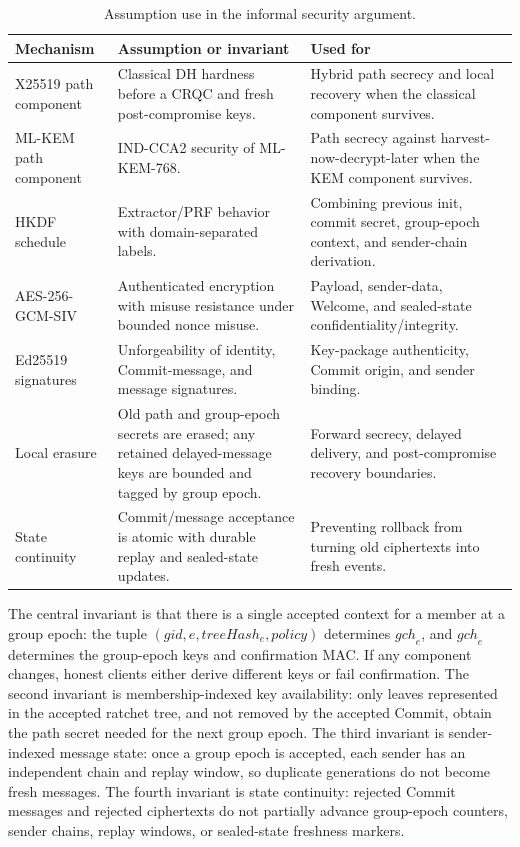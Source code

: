 \documentclass[preprint,12pt]{elsarticle}
\theoremstyle{definition}
\newcommand{\gid}{\mathit{gid}}
\newcommand{\gch}{\mathit{gch}}
\newcommand{\policy}{\mathit{policy}}
\newcommand{\treehash}{\mathit{treeHash}}
\begin{document}
\begin{table}[tbp]
\centering
\caption{Assumption use in the informal security argument.}\label{tab:assumptions}
\small
\begin{tabularx}{\textwidth}{@{}p{}YY@{}}
\toprule
Mechanism & Assumption or invariant & Used for \\
\midrule
X25519 path component & Classical DH hardness before a CRQC and fresh post-compromise keys. & Hybrid path secrecy and local recovery when the classical component survives. \\
ML-KEM path component & IND-CCA2 security of ML-KEM-768. & Path secrecy against harvest-now-decrypt-later when the KEM component survives. \\
HKDF schedule & Extractor/PRF behavior with domain-separated labels. & Combining previous init, commit secret, group-epoch context, and sender-chain derivation. \\
AES-256-GCM-SIV & Authenticated encryption with misuse resistance under bounded nonce misuse. & Payload, sender-data, Welcome, and sealed-state confidentiality/integrity. \\
Ed25519 signatures & Unforgeability of identity, Commit-message, and message signatures. & Key-package authenticity, Commit origin, and sender binding. \\
Local erasure & Old path and group-epoch secrets are erased; any retained delayed-message keys are bounded and tagged by group epoch. & Forward secrecy, delayed delivery, and post-compromise recovery boundaries. \\
State continuity & Commit/message acceptance is atomic with durable replay and sealed-state updates. & Preventing rollback from turning old ciphertexts into fresh events. \\
\bottomrule
\end{tabularx}
\end{table}

The central invariant is that there is a single accepted context for a
member at a group epoch: the tuple $(\gid,e,\treehash_e,\policy)$ determines
$\gch_e$, and $\gch_e$ determines the group-epoch keys and confirmation MAC. If any
component changes, honest clients either derive different keys or fail
confirmation. The second invariant is membership-indexed key availability:
only leaves represented in the accepted ratchet tree, and not removed by the
accepted Commit, obtain the path secret needed for the next group epoch. The third
invariant is sender-indexed message state: once a group epoch is accepted, each
sender has an independent chain and replay window, so duplicate generations do
not become fresh messages. The fourth invariant is state continuity: rejected
Commit messages and rejected ciphertexts do not partially advance group-epoch counters,
sender chains, replay windows, or sealed-state freshness markers.
\end{document}
